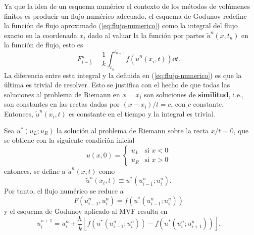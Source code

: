 Ya que la idea de un esquema numérico el contexto de los métodos de volúmenes finitos es producir un flujo numérico adecuado, el esquema de Godunov redefine la función de flujo aproximado (\ref{eq:flujo-numerico}) como la integral del flujo exacto en la coordenada $x_i$ dado al valuar la  la función por partes $\tilde{u}^{n}(x,t_n)$ en la función de flujo, esto es
\begin{equation}
	F_{i-\frac{1}{2}}^{n} = \frac{1}{k}\int_{t_n}^{t_{n+1}}f(\tilde{u}^{n}(x_i,t))\dd{t}.
\end{equation}
La diferencia entre esta integral y la definida en (\ref{eq:flujo-numerico}) es que la última es trivial de resolver. Esto se justifica con el hecho de que todas las soluciones al problema de Riemann en $x=x_{i}$ son soluciones de \textbf{similitud}, i.e., son constantes en las rectas dadas por $(x-x_{i})/t = c$, con $c$ constante. Entonces, $\tilde{u}^{n}(x_{i},t)$ es constante en el tiempo y la integral es trivial.

Sea $u^{*}(u_L; u_R)$ la solución al problema de Riemann sobre la recta $x/t = 0$, que se obtiene con la siguiente condición inicial
\begin{equation}
	u(x,0) = 
	\begin{cases}
		u_L & \text{si } x < 0 \\
		u_R & \text{si } x > 0
	\end{cases}
\end{equation}
entonces, se define a $\tilde{u}^{n}(x,t)$ como
\begin{equation}
	\tilde{u}^{n}(x_{i},t) \equiv u^{*}(u_{i-1}^{n} ; u_{i}^{n}).
\end{equation}
Por tanto, el flujo numérico se reduce a
\begin{equation}
	F(u_{i-1}^{n}, u_{i}^{n}) = f(u^{*}(u_{i-1}^{n} ; u_{i}^{n}))
\end{equation}
y el esquema de Godunov aplicado al MVF resulta en
\begin{equation}
	u_{i}^{n+1} = u_{i}^{n} + \frac{h}{k} \left[f(u^{*}(u_{i-1}^{n} ; u_{i}^{n})) - f(u^{*}(u_{i}^{n} ; u_{i+1}^{n}))\right].
\end{equation}


